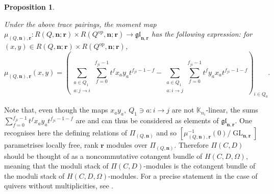 \documentclass[11pt,english]{article}
\numberwithin{equation}{section}
\numberwithin{figure}{section}
\theoremstyle{definition}
\theoremstyle{plain}
\newtheorem{prop}[df]{Proposition}
\theoremstyle{remark}
\DeclareMathOperator{\GL}{GL}
\newcommand\nn{\mathbf{n}}
\newcommand\rr{\mathbf{r}}
\newcommand\KK{\mathbb{K}}
\begin{document}
\begin{prop}{\cite{Yam}}

Under the above trace pairings, the moment map $\mu_{(Q,\nn),\rr}:R(Q,\nn;\rr)\times R(Q^{\mathrm{op}},\nn;\rr)\rightarrow\mathfrak{gl}_{\nn,\rr}$
has the following expression: for $(x,y)\in R(Q,\nn;\rr)\times R(Q^{\mathrm{op}},\nn;\rr)$,\[
\mu_{(Q,\nn),\rr}(x,y)=
\left(
\sum_{\substack{a\in Q_1 \\ a:j\rightarrow i}}
\sum_{f=0}^{f_{ji}-1}
t^{f}x_ay_at^{f_{ji}-1-f}
-
\sum_{\substack{a\in Q_1 \\ a:i\rightarrow j}}
\sum_{f=0}^{f_{ji}-1}
t^{f}y_ax_at^{f_{ji}-1-f}
\right)_{i\in Q_0}
.
\]\end{prop}

Note that, even though the maps $x_{a}y_{a},\ Q_{1}\ni a:i\rightarrow j$
are not $\KK_{n_{i}}$-linear, the sums $\sum_{f=0}^{f_{ji}-1}t^{f}x_{a}y_{a}t^{f_{ji}-1-f}$
are and can thus be considered as elements of $\mathfrak{gl}_{\nn,\rr}$.
One recognises here the defining relations of $\Pi_{(Q,\nn)}$ and
so $\left[\mu_{(Q,\nn),\rr}^{-1}(0)/\GL_{\nn,\rr}\right]$ parametrises
locally free, rank $\rr$ modules over $\Pi_{(Q,\nn)}$. Therefore
$\Pi(C,D)$ should be thought of as a noncommutative cotangent bundle
of $H(C,D,\Omega)$, meaning that the moduli stack of $\Pi(C,D)$-modules
is the cotangent bundle of the moduli stack of $H(C,D,\Omega)$-modules.
For a precise statement in the case of quivers without multiplicities,
see \cite[Rmk. 4.18.]{BCS20}.
\end{document}
